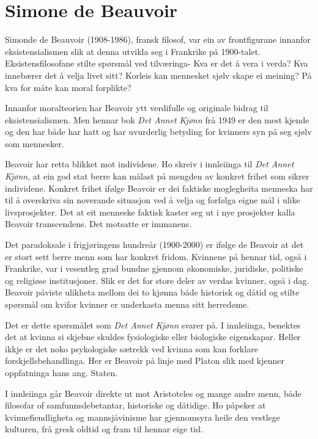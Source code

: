 \documentclass[a4paper]{IEEEtran}
\begin{document}
\section{Simone de Beauvoir}
\label{beauvoir}\bigskip

Simonde de Beauvoir (1908-1986), fransk filosof, var ein av frontfigurane innanfor eksistensialismen slik at denna utvikla seg i Frankrike på 1900-talet. Eksistensfilosofane stilte spørsmål ved tilværinga- Kva er det å vera i verda? Kva innebærer det å velja livet sitt? Korleis kan mennesket sjølv skape ei meining? På kva for måte kan moral forplikte?\bigskip

Innanfor moralteorien har Beavoir ytt verdifulle og originale bidrag til eksistensialismen. Men hennar bok \textit{Det Annet Kjønn} frå 1949 er den mest kjende og den har både har hatt og har uvurderlig betyding for kvinners syn på seg sjølv som mennesker.\bigskip

Beavoir har retta blikket mot individene. Ho skreiv i innleiinga til \textit{Det Annet Kjønn}, at ein god stat berre kan målast på mengden av konkret frihet som sikrer individene. Konkret frihet ifølge Beavoir er dei faktiske moglegheita menneska har til å overskriva sin noverande situasjon ved å velja og forfølga eigne mål i ulike livsprosjekter. Det at eit menneske faktisk kaster seg ut i nye prosjekter kalla Beavoir transcendens. Det motsatte er immanens.\bigskip

Det paradoksale i frigjøringens hundreår (1900-2000) er ifølge de Beavoir at det er stort sett berre menn som har konkret fridom. Kvinnene på hennar tid, også i Frankrike, var i vesentleg grad bundne gjennom økonomiske, juridiske, politiske og religiøse institusjoner. Slik er det for store deler av verdas kvinner, også i dag. Beavoir påviste ulikheta mellom dei to kjønna både historisk og dåtid og stilte spørsmål om kvifor kvinner er underkasta menna sitt herredøme.\bigskip

Det er dette spørsmålet som \textit{Det Annet Kjønn} svarer på. I innleiinga, benektes det at kvinna si skjebne skuldes fysiologiske eller biologiske eigenskapar. Heller ikkje er det noko psykologiske sætrekk ved kvinna som kan forklare forskjellsbehandlinga. Her er Beavoir på linje med Platon slik med kjenner oppfatninga hans ang. Staten.\bigskip

I innleiinga går Beavoir direkte ut mot Aristoteles og mange andre menn, både filosofar of samfunnsdebetantar, historiske og dåtidige. Ho påpeker at kvinnefiendligheta og mannsjåvinisme har gjennomsyra heile den vestlege kulturen, frå gresk oldtid og fram til hennar eige tid.\bigskip
\end{document}
